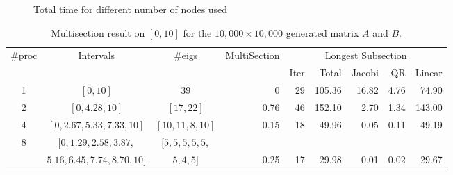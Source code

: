 \begin{figure}[htbp]
	\centering
	\caption{Total time for different number of nodes used}
  \label{fig:timenodes}
\end{figure}

\begin{table*}
\begin{center}
\begin{tabular}{|c | c | c | r | r | r | r | r | r |}
\hline
$\#$proc & Intervals & $\#$eigs & MultiSection & \multicolumn{5}{c|}{Longest Subsection} \\
  & & &  & Iter & Total & Jacobi & QR & Linear \\
\hline
1 & $[0, 10]$ & 39 & 0 & 29 & 105.36 & 16.82 & 4.76 & 74.90 \\
2 & $[0, 4.28, 10]$ & $[17, 22]$ & 0.76 &  46 & 152.10 & 2.70 & 1.34 & 143.00\\
4 & $[0, 2.67, 5.33, 7.33, 10]$ & $[10, 11, 8, 10]$ & 0.15 & 18 & 49.96 & 0.05 & 0.11 & 49.19 \\
8 &$[0, 1.29, 2.58, 3.87, $ & $[5, 5, 5, 5, 5,$ & &  & & & & \\
& $5.16, 6.45, 7.74, 8.70, 10]$& $5, 4, 5]$& 0.25 & 17 & 29.98 & 0.01 & 0.02 & 29.67\\
\hline
\end{tabular}
\caption{Multisection result on $[0, 10]$ for the $10,000 \times 10,000$ generated matrix $A$ and $B$.}
\label{tab:result-multisection}
\end{center}
\end{table*}

